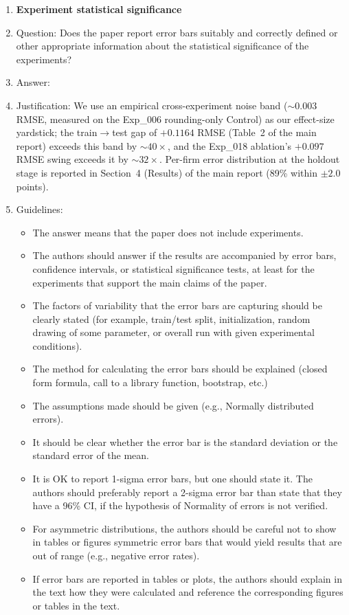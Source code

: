 \documentclass{article}
\begin{document}
\begin{enumerate}
\item {\bf Experiment statistical significance}
    \item[] Question: Does the paper report error bars suitably and correctly defined or other appropriate information about the statistical significance of the experiments?
    \item[] Answer: \answerYes{}
    \item[] Justification: We use an empirical cross-experiment noise band ($\sim 0.003$ RMSE, measured on the Exp\_006 rounding-only Control) as our effect-size yardstick; the train$\to$test gap of $+0.1164$ RMSE (Table~2 of the main report) exceeds this band by $\sim 40\times$, and the Exp\_018 ablation's $+0.097$ RMSE swing exceeds it by $\sim 32\times$. Per-firm error distribution at the holdout stage is reported in Section~4 (Results) of the main report (89\% within $\pm 2.0$ points).
    \item[] Guidelines:
    \begin{itemize}
        \item The answer \answerNA{} means that the paper does not include experiments.
        \item The authors should answer \answerYes{} if the results are accompanied by error bars, confidence intervals, or statistical significance tests, at least for the experiments that support the main claims of the paper.
        \item The factors of variability that the error bars are capturing should be clearly stated (for example, train/test split, initialization, random drawing of some parameter, or overall run with given experimental conditions).
        \item The method for calculating the error bars should be explained (closed form formula, call to a library function, bootstrap, etc.)
        \item The assumptions made should be given (e.g., Normally distributed errors).
        \item It should be clear whether the error bar is the standard deviation or the standard error of the mean.
        \item It is OK to report 1-sigma error bars, but one should state it. The authors should preferably report a 2-sigma error bar than state that they have a 96\% CI, if the hypothesis of Normality of errors is not verified.
        \item For asymmetric distributions, the authors should be careful not to show in tables or figures symmetric error bars that would yield results that are out of range (e.g., negative error rates).
        \item If error bars are reported in tables or plots, the authors should explain in the text how they were calculated and reference the corresponding figures or tables in the text.
    \end{itemize}


\end{enumerate}
\end{document}
